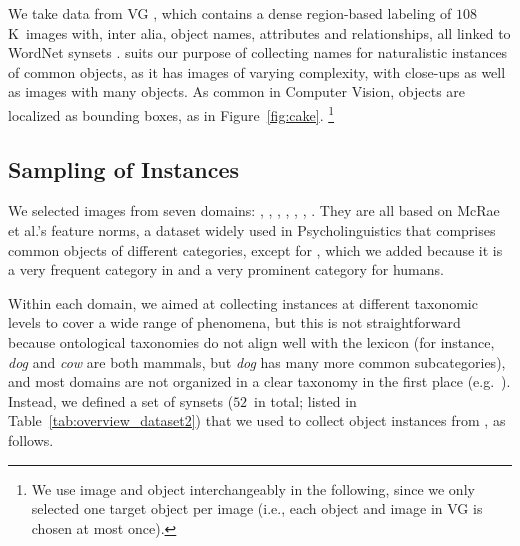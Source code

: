 We take data from VG \cite{krishna2016visualgenome}, which
contains a dense region-based labeling of $108$K~images with, inter alia, object names, attributes and relationships,
all linked to WordNet synsets \cite{fellbaum1998wordnet}.
\vg suits our purpose of collecting names for naturalistic instances of common objects, as it has images of varying complexity, with close-ups as well as images with many objects.
As common in Computer Vision, objects are localized as bounding boxes, as in Figure~\ref{fig:cake}.%
\footnote{We use image and object interchangeably in the following, since we only selected one target object per image (i.e., each object and image in VG is chosen at most once).}

\subsection{Sampling of Instances}
\label{ssec:sampling}

We selected images from seven domains: , , , , , , . 
They are all based on McRae et al.'s  \cite{mcrae2005semantic} feature norms, a dataset widely used in Psycholinguistics that comprises common objects of different categories, except for , which we added because it is a very frequent category in \vg and a very prominent category for humans.

Within each domain, we aimed at collecting instances at different taxonomic levels to cover a wide range of phenomena, but this is not straightforward because ontological taxonomies do not align well with the lexicon (for instance, \textit{dog} and \textit{cow} are both mammals, but \textit{dog} has many more common subcategories), and most domains are not organized in a clear taxonomy in the first place (e.g.\ ).
Instead, we defined a set of synsets ($52$\ in total; listed in Table~\ref{tab:overview_dataset2}) that we used to collect object instances from \vg, as follows. 

